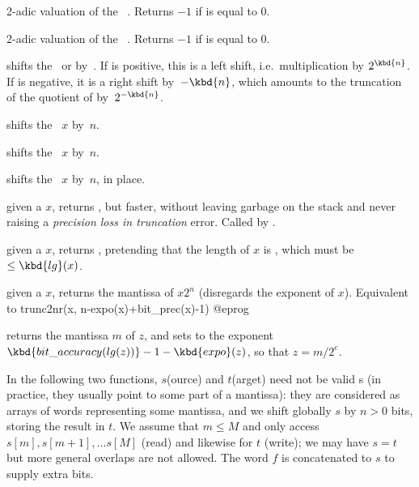 
 2-adic valuation of the ~. Returns
$-1$ if  is equal to 0.

 2-adic valuation of the ~. Returns $-1$
if  is equal to 0.

 shifts the~ or
  by~. If  is positive, this is a left shift,
i.e.~multiplication by $2^{\kbd{n}}$. If  is negative, it is a right
shift by~$-\kbd{n}$, which amounts to the truncation of the quotient of 
by~$2^{-\kbd{n}}$.

 shifts the ~$x$ by~$n$.

 shifts the ~$x$ by~$n$.

 shifts the ~$x$ by~$n$,
in place.

 given a  $x$, returns
, but faster, without leaving garbage on the stack
and never raising a \emph{precision loss in truncation} error.
Called by .

 given a  $x$, returns
, pretending that the length of $x$ is , which
must be $\leq \kbd{lg}(x)$.

 given a  $x$, returns
the mantissa of $x 2^n$ (disregards the exponent of $x$). Equivalent to
\bprog
  trunc2nr(x, n-expo(x)+bit_prec(x)-1)
@eprog

 returns the mantissa $m$ of $z$, and
sets  to the exponent $\kbd{bit\_accuracy(lg(z))}-1-\kbd{expo}(z)$,
so that $z = m / 2^e$.

 In the following two functions, $s$(ource) and $t$(arget)
need not be valid s (in practice, they usually point to some part of a
 mantissa): they are considered as arrays of words representing some
mantissa, and we shift globally $s$ by $n > 0$ bits, storing the result in
$t$. We assume that $m\leq M$ and only access $s[m], s[m+1],\ldots s[M]$
(read) and likewise for $t$ (write); we may have $s = t$ but more general
overlaps are not allowed. The word $f$ is concatenated to $s$ to supply extra
bits.

